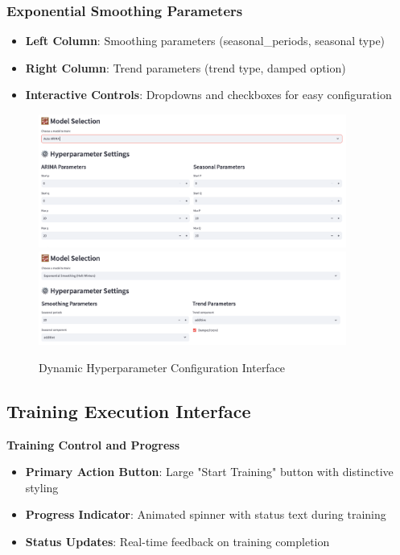 \subsubsection{Exponential Smoothing Parameters}
\begin{itemize}
    \item \textbf{Left Column}: Smoothing parameters (seasonal\_periods, seasonal type)
    \item \textbf{Right Column}: Trend parameters (trend type, damped option)
    \item \textbf{Interactive Controls}: Dropdowns and checkboxes for easy configuration
\end{itemize}

\begin{figure}[H]
    \centering
    \includegraphics[width=0.9\textwidth]{Images/04GUIAndUserInterface/HyperparameterConfigArima.png}
    \includegraphics[width=0.9\textwidth]{Images/04GUIAndUserInterface/HyperparameterConfigETS.png}
    \caption{Dynamic Hyperparameter Configuration Interface}
    \label{fig:hyperparameter_config}
\end{figure}

\subsection{Training Execution Interface}

\textbf{Training Control and Progress}

\begin{itemize}
    \item \textbf{Primary Action Button}: Large "Start Training" button with distinctive styling
    \item \textbf{Progress Indicator}: Animated spinner with status text during training
    \item \textbf{Status Updates}: Real-time feedback on training completion
\end{itemize}

